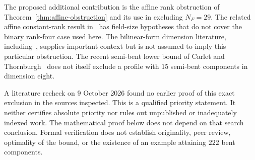 \documentclass[11pt,a4paper]{article}
\numberwithin{equation}{section}
\theoremstyle{definition}
\begin{document}
The proposed additional contribution is the affine rank obstruction of Theorem~\ref{thm:affine-obstruction} and its use in excluding $N_F=29$. The related affine constant-rank result in~\cite{Pazzis} has field-size hypotheses that do not cover the binary rank-four case used here. The bilinear-form dimension literature, including~\cite{Gow}, supplies important context but is not assumed to imply this particular obstruction. The recent semi-bent lower bound of Carlet and Thornburgh~\cite{CT} does not itself exclude a profile with $15$ semi-bent components in dimension eight.

A literature recheck on 9 October 2026 found no earlier proof of this exact exclusion in the sources inspected. This is a qualified priority statement. It neither certifies absolute priority nor rules out unpublished or inadequately indexed work. The mathematical proof below does not depend on that search conclusion. Formal verification does not establish originality, peer review, optimality of the bound, or the existence of an example attaining $222$ bent components.




\appendix


\end{document}
